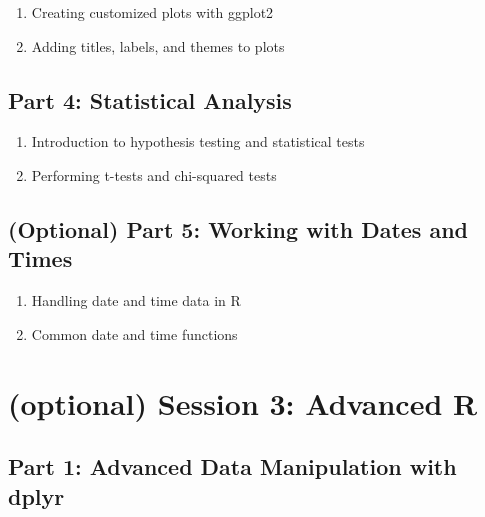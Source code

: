 \documentclass[
]{book}
\providecommand{\tightlist}{%
  \setlength{\itemsep}{0pt}\setlength{\parskip}{0pt}}
\begin{document}
\begin{enumerate}
\def\labelenumi{\arabic{enumi}.}
\tightlist
\item
  Creating customized plots with ggplot2
\item
  Adding titles, labels, and themes to plots
\end{enumerate}

\subsection*{Part 4: Statistical Analysis}\label{part-4-statistical-analysis}

\begin{enumerate}
\def\labelenumi{\arabic{enumi}.}
\tightlist
\item
  Introduction to hypothesis testing and statistical tests
\item
  Performing t-tests and chi-squared tests
\end{enumerate}

\subsection*{(Optional) Part 5: Working with Dates and Times}\label{optional-part-5-working-with-dates-and-times}

\begin{enumerate}
\def\labelenumi{\arabic{enumi}.}
\tightlist
\item
  Handling date and time data in R
\item
  Common date and time functions
\end{enumerate}

\section*{(optional) Session 3: Advanced R}\label{optional-session-3-advanced-r}

\subsection*{Part 1: Advanced Data Manipulation with dplyr}\label{part-1-advanced-data-manipulation-with-dplyr}
\end{document}
